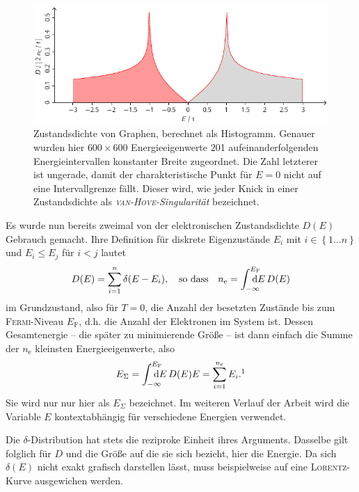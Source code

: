 \documentclass[a4paper, 10pt, twoside, openany]{book} %
\newcommand \braces[1]{\left \lbrace #1 \right \rbrace}
\def \D {\mathrm d}
\def \nE {n_\mathrm{e}}
\begin{document}
\begin{figure}
    \includegraphics[width=\textwidth]{Abbildungen/Bandstrukturen/DOS_C2.pdf}
    \caption[Zustandsdichte von Graphen]{Zustandsdichte von Graphen, berechnet als Histogramm. Genauer wurden hier $600 \times 600$ Energieeigenwerte 201 aufeinanderfolgenden Energieintervallen konstanter Breite zugeordnet. Die Zahl letzterer ist ungerade, damit der charakteristische Punkt für $E = 0$ nicht auf eine Intervallgrenze fällt. Dieser wird, wie jeder Knick in einer Zustandsdichte als \emph{\textsc{van-Hove}-Singularität} \cite{vanHove} bezeichnet.}
    \label{DOS Graphen}
\end{figure}
%
Es wurde nun bereits zweimal von der elektronischen Zustandsdichte $D(E)$ Gebrauch gemacht. Ihre Definition für diskrete Eigenzustände $E_i$ mit $i \in \braces{1 \dots n}$ und $E_i \leq E_j$ für $i < j$ lautet
%
\begin{align*}
    D(E) = \sum_{i = 1}^n \delta(E - E_i), \quad \text{so dass} \quad \nE = \int_{\mathrlap{-\infty}}^{\mathrlap{E_\mathrm{F}}} \D E \, D(E)
\end{align*}
%
im Grundzustand, also für $T = 0$, die Anzahl der besetzten Zustände bis zum \textsc{Fermi}-Niveau $E_\mathrm{F}$, d.h. die Anzahl der Elektronen im System ist. Dessen Gesamtenergie -- die später zu minimierende Größe -- ist dann einfach die Summe der $\nE$ kleinsten Energieeigenwerte, also
%
\begin{align*}
    E_\Sigma = \int_{\mathrlap{-\infty}}^{\mathrlap{E_\mathrm{F}}} \D E \, D(E) E = \sum_{i = 1}^{\nE} E_i.\footnotemark
\end{align*}
%
Sie wird nur nur hier als $E_\Sigma$ bezeichnet. Im weiteren Verlauf der Arbeit wird die Variable $E$ kontextabhängig für verschiedene Energien verwendet.

Die $\delta$-Distribution hat stets die reziproke Einheit ihres Arguments. Dasselbe gilt folglich für $D$ und die Größe auf die sie sich bezieht, hier die Energie. Da sich $\delta(E)$ nicht exakt grafisch darstellen lässt, muss beispielweise auf eine \textsc{Lorentz}-Kurve ausgewichen werden.
\end{document}
